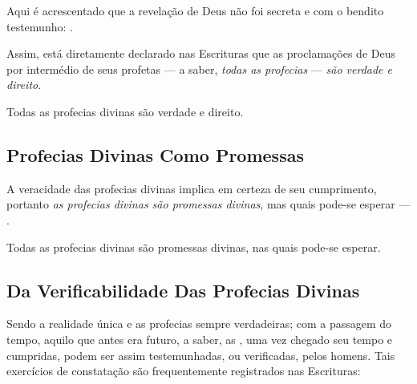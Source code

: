     Aqui é acrescentado que a revelação de Deus não foi secreta e com o bendito testemunho: .

    Assim, está diretamente declarado nas Escrituras que as proclamações de Deus por intermédio de seus profetas  ---  a  saber,
    \emph{todas as profecias} --- \emph{são verdade e direito}.

    \begin{DEF}
        \label{def.pri.verdade}
        Todas as profecias divinas são verdade e direito.
    \end{DEF}


    \subsection{Profecias Divinas Como Promessas}

        
    A veracidade das profecias divinas implica em certeza de seu cumprimento, portanto \emph{as profecias divinas são  promessas
    divinas}, mas quais pode-se esperar --- .

    \begin{DEF}
        \label{def.pri.promessa}
        Todas as profecias divinas são promessas divinas, nas quais pode-se esperar.
    \end{DEF}


    \subsection{Da Verificabilidade Das Profecias Divinas}

    Sendo a realidade única e as profecias sempre verdadeiras; com a passagem do tempo, aquilo que antes era futuro, a saber, as
    ,  uma  vez  chegado  seu  tempo  e  cumpridas,  podem  ser  assim
    testemunhadas, ou verificadas, pelos homens. Tais exercícios de constatação são frequentemente registrados nas Escrituras:

